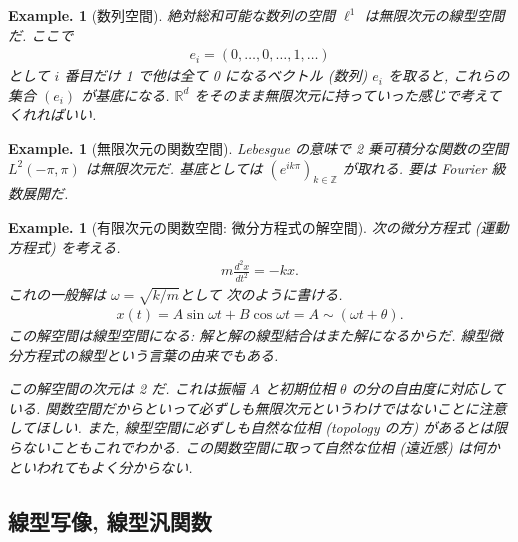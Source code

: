 \documentclass[openany, a4paper, oneside]{jsbook}
\theoremstyle{break}
\theoremstyle{breakdefn}
\newtheorem{ex}[thm]{Example.}
\newcommand{\rbk}[1]{\left (#1\right)}
\newcommand{\bbR}{\mathbb{R}}
\newcommand{\bbZ}{\mathbb{Z}}
\begin{document}
\begin{ex}[数列空間]
絶対総和可能な数列の空間 $\ell^1$ は無限次元の線型空間だ.
ここで
\begin{align}
 e_i
 =
 \rbk{0, \dots, 0, \dots, 1, \dots}
\end{align}
として $i$ 番目だけ 1 で他は全て 0 になるベクトル (数列) $e_i$ を取ると,
これらの集合 $\rbk{e_i}$ が基底になる.
$\bbR^d$ をそのまま無限次元に持っていった感じで考えてくれればいい.
\end{ex}
\begin{ex}[無限次元の関数空間]
Lebesgue の意味で 2 乗可積分な関数の空間 $L^2 (- \pi, \pi)$ は無限次元だ.
基底としては $\rbk{e^{i k \pi}}_{k \in \bbZ}$ が取れる.
要は Fourier 級数展開だ.
\end{ex}
\begin{ex}[有限次元の関数空間: 微分方程式の解空間]
次の微分方程式 (運動方程式) を考える.
\begin{align}
 m \frac{d^2 x}{dt^2}
 =
 -k x.
\end{align}
これの一般解は $\omega = \sqrt{k / m}$として 次のように書ける.
\begin{align}
 x(t)
 =
 A \sin \omega t + B \cos \omega t
 =
 A \sim \rbk{\omega t + \theta}.
\end{align}
この解空間は線型空間になる: 解と解の線型結合はまた解になるからだ.
線型微分方程式の線型という言葉の由来でもある.

この解空間の次元は 2 だ.
これは振幅 $A$ と初期位相 $\theta$ の分の自由度に対応している.
関数空間だからといって必ずしも無限次元というわけではないことに注意してほしい.
また, 線型空間に必ずしも自然な位相 (topology の方) があるとは限らないこともこれでわかる.
この関数空間に取って自然な位相 (遠近感) は何かといわれてもよく分からない.
\end{ex}
\subsection{線型写像, 線型汎関数}
\end{document}
